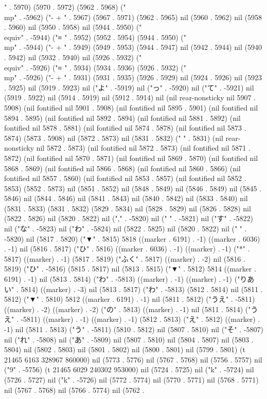" . 5970) (5970 . 5972) (5962 . 5968) ("\\mp" . -5962) ("-
+
" . 5967) (5967 . 5971) (5962 . 5965) nil (5960 . 5962) nil (5958 . 5960) nil (5950 . 5958) nil (5944 . 5950) ("\\equiv" . -5944) ("≡
" . 5952) (5952 . 5954) (5944 . 5950) ("\\mp" . -5944) ("-
+
" . 5949) (5949 . 5953) (5944 . 5947) nil (5942 . 5944) nil (5940 . 5942) nil (5932 . 5940) nil (5926 . 5932) ("\\equiv" . -5926) ("≡
" . 5934) (5934 . 5936) (5926 . 5932) ("\\mp" . -5926) ("-
+
" . 5931) (5931 . 5935) (5926 . 5929) nil (5924 . 5926) nil (5923 . 5925) nil (5919 . 5923) nil ("よ" . -5919) nil ("っ" . -5920) nil ("て" . -5921) nil (5919 . 5922) nil (5914 . 5919) nil (5912 . 5914) nil (nil rear-nonsticky nil 5907 . 5908) (nil fontified nil 5901 . 5908) (nil fontified nil 5895 . 5901) (nil fontified nil 5894 . 5895) (nil fontified nil 5892 . 5894) (nil fontified nil 5881 . 5892) (nil fontified nil 5878 . 5881) (nil fontified nil 5874 . 5878) (nil fontified nil 5873 . 5874) (5873 . 5908) nil (5872 . 5873) nil (5831 . 5832) ("  " . 5831) (nil rear-nonsticky nil 5872 . 5873) (nil fontified nil 5872 . 5873) (nil fontified nil 5871 . 5872) (nil fontified nil 5870 . 5871) (nil fontified nil 5869 . 5870) (nil fontified nil 5868 . 5869) (nil fontified nil 5866 . 5868) (nil fontified nil 5860 . 5866) (nil fontified nil 5857 . 5860) (nil fontified nil 5853 . 5857) (nil fontified nil 5852 . 5853) (5852 . 5873) nil (5851 . 5852) nil (5848 . 5849) nil (5846 . 5849) nil (5845 . 5846) nil (5844 . 5846) nil (5841 . 5843) nil (5840 . 5842) nil (5833 . 5840) nil (5831 . 5833) (5831 . 5832) (5829 . 5834) nil (5828 . 5829) nil (5826 . 5828) nil (5822 . 5826) nil (5820 . 5822) nil ("," . -5820) nil (" " . -5821) nil ("す" . -5822) nil ("な" . -5823) nil ("わ" . -5824) nil (5822 . 5825) nil (5820 . 5822) nil (" " . -5820) nil (5817 . 5820) ("▼" . 5815) 5818 ((marker . 6191) . -1) ((marker . 6036) . -1) nil (5816 . 5817) ("ひ" . 5816) ((marker . 6036) . -1) ((marker) . -1) ("*" . 5817) ((marker) . -1) (5817 . 5819) ("ふく" . 5817) ((marker) . -2) nil (5816 . 5819) ("ひ" . -5816) (5815 . 5817) nil (5813 . 5815) ("▼" . 5812) 5814 ((marker . 6191) . -1) nil (5813 . 5814) ("わ" . -5813) ((marker) . -1) ((marker) . -1) ("りあい" . 5814) ((marker) . -3) nil (5813 . 5817) ("わ" . -5813) (5812 . 5814) nil (5811 . 5812) ("▼" . 5810) 5812 ((marker . 6191) . -1) nil (5811 . 5812) ("うえ" . -5811) ((marker) . -2) ((marker) . -2) ("の" . 5813) ((marker) . -1) nil (5811 . 5814) ("うえ" . -5811) ((marker) . -1) ((marker) . -1) (5812 . 5813) ("え" . 5812) ((marker) . -1) nil (5811 . 5813) ("う" . -5811) (5810 . 5812) nil (5807 . 5810) nil ("そ" . -5807) nil ("れ" . -5808) nil ("あ" . -5809) nil (5807 . 5810) nil (5804 . 5807) nil (5803 . 5804) nil (5802 . 5803) nil (5801 . 5802) nil (5800 . 5801) nil (5799 . 5801) (t 21465 6163 328967 860000) nil (5773 . 5776) nil (5767 . 5768) nil (5756 . 5757) nil ("9" . -5756) (t 21465 6029 240302 953000) nil (5724 . 5725) nil ("k" . -5724) nil (5726 . 5727) nil ("k" . -5726) nil (5772 . 5774) nil (5770 . 5771) nil (5768 . 5771) nil (5767 . 5768) nil (5766 . 5774) nil (5762 . 